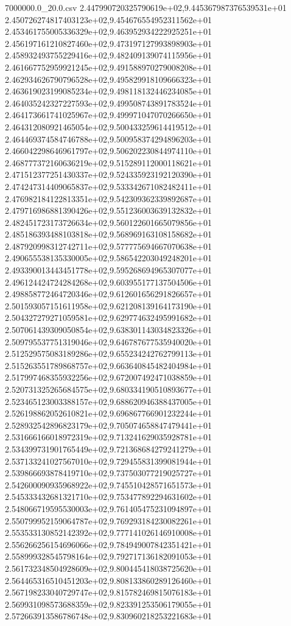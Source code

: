 \begin{filecontents*}{7000000.0_20.0.csv}
2.447990720325790619e+02,9.445367987376539531e+01
2.450726274817403123e+02,9.454676554952311562e+01
2.453461755005336329e+02,9.463952934222925251e+01
2.456197161210827460e+02,9.473197127993898903e+01
2.458932493755229416e+02,9.482409139074115956e+01
2.461667752959921245e+02,9.491588970279008208e+01
2.462934626790796528e+02,9.495829918109666323e+01
2.463619023199085234e+02,9.498118132446234085e+01
2.464035242327227593e+02,9.499508743891783524e+01
2.464173661741025967e+02,9.499971047070266650e+01
2.464312080921465054e+02,9.500433259614419512e+01
2.464469374584746788e+02,9.500958374294896203e+01
2.466042298646961797e+02,9.506202230844974110e+01
2.468777372160636219e+02,9.515289112000118621e+01
2.471512377251430337e+02,9.524335923192120390e+01
2.474247314409065837e+02,9.533342671082482411e+01
2.476982184122813351e+02,9.542309362339892687e+01
2.479716986881390426e+02,9.551236003639132832e+01
2.482451723173726634e+02,9.560122601665079856e+01
2.485186393488103818e+02,9.568969163108158682e+01
2.487920998312742711e+02,9.577775694667070638e+01
2.490655538135330005e+02,9.586542203049248201e+01
2.493390013443451778e+02,9.595268694965307077e+01
2.496124424724284268e+02,9.603955177137504506e+01
2.498858772464720346e+02,9.612601656291826657e+01
2.501593057151611958e+02,9.621208139164173190e+01
2.504327279271059581e+02,9.629774632495991682e+01
2.507061439309050854e+02,9.638301143034823326e+01
2.509795537751319046e+02,9.646787677535940020e+01
2.512529575083189286e+02,9.655234242762799113e+01
2.515263551789868757e+02,9.663640845482404984e+01
2.517997468355932256e+02,9.672007492471038859e+01
2.520731325265684575e+02,9.680334190510893677e+01
2.523465123003388157e+02,9.688620946388437005e+01
2.526198862052610821e+02,9.696867766901232244e+01
2.528932542896823179e+02,9.705074658847479441e+01
2.531666166018972319e+02,9.713241629035928781e+01
2.534399731901765449e+02,9.721368684279241279e+01
2.537133241027567010e+02,9.729455831399081944e+01
2.539866693878419710e+02,9.737503077219025727e+01
2.542600090935968922e+02,9.745510428571651573e+01
2.545333432681321710e+02,9.753477892294631602e+01
2.548066719595530003e+02,9.761405475231094897e+01
2.550799952159064787e+02,9.769293184230082261e+01
2.553533130852142392e+02,9.777141026146910008e+01
2.556266256154696066e+02,9.784949007842351421e+01
2.558999328545798164e+02,9.792717136182091053e+01
2.561732348504928609e+02,9.800445418038725620e+01
2.564465316510451203e+02,9.808133860289126460e+01
2.567198233040729747e+02,9.815782469815076183e+01
2.569931098573688359e+02,9.823391253506179055e+01
2.572663913586786748e+02,9.830960218253221683e+01

\end{filecontents*}
